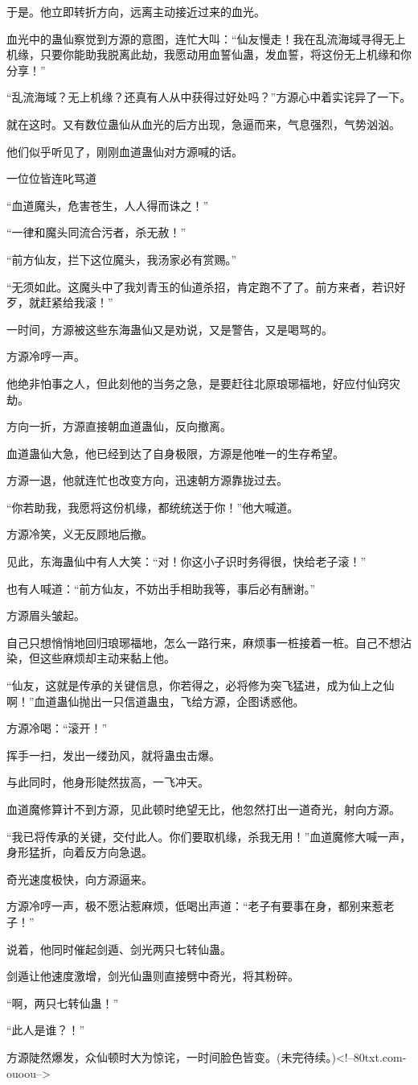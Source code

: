\begin{this_body}
于是。他立即转折方向，远离主动接近过来的血光。

血光中的蛊仙察觉到方源的意图，连忙大叫：“仙友慢走！我在乱流海域寻得无上机缘，只要你能助我脱离此劫，我愿动用血誓仙蛊，发血誓，将这份无上机缘和你分享！”

“乱流海域？无上机缘？还真有人从中获得过好处吗？”方源心中着实诧异了一下。

就在这时。又有数位蛊仙从血光的后方出现，急逼而来，气息强烈，气势汹汹。

他们似乎听见了，刚刚血道蛊仙对方源喊的话。

一位位皆连叱骂道

“血道魔头，危害苍生，人人得而诛之！”

“一律和魔头同流合污者，杀无赦！”

“前方仙友，拦下这位魔头，我汤家必有赏赐。”

“无须如此。这魔头中了我刘青玉的仙道杀招，肯定跑不了了。前方来者，若识好歹，就赶紧给我滚！”

一时间，方源被这些东海蛊仙又是劝说，又是警告，又是喝骂的。

方源冷哼一声。

他绝非怕事之人，但此刻他的当务之急，是要赶往北原琅琊福地，好应付仙窍灾劫。

方向一折，方源直接朝血道蛊仙，反向撤离。

血道蛊仙大急，他已经到达了自身极限，方源是他唯一的生存希望。

方源一退，他就连忙也改变方向，迅速朝方源靠拢过去。

“你若助我，我愿将这份机缘，都统统送于你！”他大喊道。

方源冷笑，义无反顾地后撤。

见此，东海蛊仙中有人大笑：“对！你这小子识时务得很，快给老子滚！”

也有人喊道：“前方仙友，不妨出手相助我等，事后必有酬谢。”

方源眉头皱起。

自己只想悄悄地回归琅琊福地，怎么一路行来，麻烦事一桩接着一桩。自己不想沾染，但这些麻烦却主动来黏上他。

“仙友，这就是传承的关键信息，你若得之，必将修为突飞猛进，成为仙上之仙啊！”血道蛊仙抛出一只信道蛊虫，飞给方源，企图诱惑他。

方源冷喝：“滚开！”

挥手一扫，发出一缕劲风，就将蛊虫击爆。

与此同时，他身形陡然拔高，一飞冲天。

血道魔修算计不到方源，见此顿时绝望无比，他忽然打出一道奇光，射向方源。

“我已将传承的关键，交付此人。你们要取机缘，杀我无用！”血道魔修大喊一声，身形猛折，向着反方向急退。

奇光速度极快，向方源逼来。

方源冷哼一声，极不愿沾惹麻烦，低喝出声道：“老子有要事在身，都别来惹老子！”

说着，他同时催起剑遁、剑光两只七转仙蛊。

剑遁让他速度激增，剑光仙蛊则直接劈中奇光，将其粉碎。

“啊，两只七转仙蛊！”

“此人是谁？！”

方源陡然爆发，众仙顿时大为惊诧，一时间脸色皆变。(未完待续。)<!--80txt.com-ouoou-->

\end{this_body}

